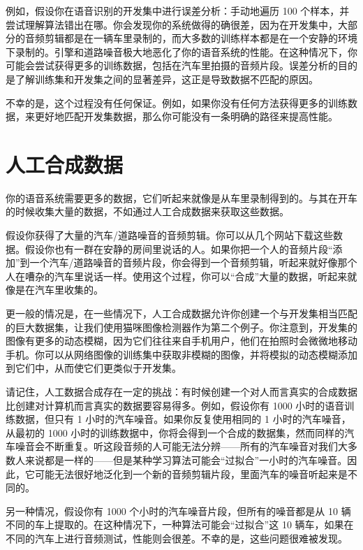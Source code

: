 例如，假设你在语音识别的开发集中进行误差分析：手动地遍历 100
个样本，并尝试理解算法错出在哪。你会发现你的系统做得的确很差，因为在开发集中，大部分的音频剪辑都是在一辆车里录制的，而大多数的训练样本都是在一个安静的环境下录制的。引擎和道路噪音极大地恶化了你的语音系统的性能。在这种情况下，你可能会尝试获得更多的训练数据，包括在汽车里拍摄的音频片段。误差分析的目的是了解训练集和开发集之间的显著差异，这正是导致数据不匹配的原因。

不幸的是，这个过程没有任何保证。例如，如果你没有任何方法获得更多的训练数据，来更好地匹配开发集数据，那么你可能没有一条明确的路径来提高性能。

\hypertarget{ux4ebaux5de5ux5408ux6210ux6570ux636e}{%
\chapter{人工合成数据}\label{ux4ebaux5de5ux5408ux6210ux6570ux636e}}

你的语音系统需要更多的数据，它们听起来就像是从车里录制得到的。与其在开车的时候收集大量的数据，不如通过人工合成数据来获取这些数据。

假设你获得了大量的汽车/道路噪音的音频剪辑。你可以从几个网站下载这些数据。假设你也有一群在安静的房间里说话的人。如果你把一个人的音频片段``添加''到一个汽车/道路噪音的音频片段，你会得到一个音频剪辑，听起来就好像那个人在嘈杂的汽车里说话一样。使用这个过程，你可以``合成''大量的数据，听起来就像是在汽车里收集的。

更一般的情况是，在一些情况下，人工合成数据允许你创建一个与开发集相当匹配的巨大数据集，让我们使用猫咪图像检测器作为第二个例子。你注意到，开发集的图像有更多的动态模糊，因为它们往往来自手机用户，他们在拍照时会微微地移动手机。你可以从网络图像的训练集中获取非模糊的图像，并将模拟的动态模糊添加到它们中，从而使它们更类似于开发集。

请记住，人工数据合成存在一定的挑战：有时候创建一个对人而言真实的合成数据比创建对计算机而言真实的数据要容易得多。例如，假设你有
1000 小时的语音训练数据，但只有 1 小时的汽车噪音。如果你反复使用相同的 1
小时的汽车噪音，从最初的 1000
小时的训练数据中，你将会得到一个合成的数据集，然而同样的汽车噪音会不断重复。听这段音频的人可能无法分辨------所有的汽车噪音对我们大多数人来说都是一样的------但是某种学习算法可能会``过拟合''一小时的汽车噪音。因此，它可能无法很好地泛化到一个新的音频剪辑片段，里面汽车的噪音听起来是不同的。

另一种情况，假设你有 1000 个小时的汽车噪音片段，但所有的噪音都是从 10
辆不同的车上提取的。在这种情况下，一种算法可能会``过拟合''这 10
辆车，如果在不同的汽车上进行音频测试，性能则会很差。不幸的是，这些问题很难被发现。

